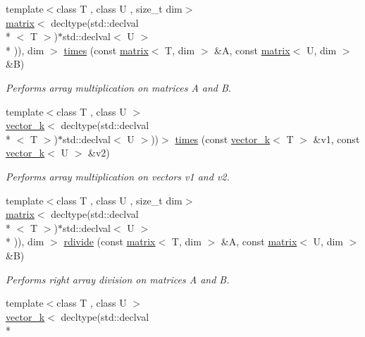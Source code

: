 \begin{DoxyCompactItemize}
\item 
{\footnotesize template$<$class T , class U , size\-\_\-t dim$>$ }\\\hyperlink{classkeycpp_1_1matrix}{matrix}$<$ decltype(std\-::declval\\*
$<$ T $>$)$\ast$std\-::declval$<$ U $>$\\*
)), dim $>$ \hyperlink{namespacekeycpp_a23a0fd48168263aad7f77f1769dc2f2a}{times} (const \hyperlink{classkeycpp_1_1matrix}{matrix}$<$ T, dim $>$ \&A, const \hyperlink{classkeycpp_1_1matrix}{matrix}$<$ U, dim $>$ \&B)
\begin{DoxyCompactList}\small\item\em Performs array multiplication on matrices A and B. \end{DoxyCompactList}\item 
{\footnotesize template$<$class T , class U $>$ }\\\hyperlink{classkeycpp_1_1vector__k}{vector\-\_\-k}$<$ decltype(std\-::declval\\*
$<$ T $>$)$\ast$std\-::declval$<$ U $>$))$>$ \hyperlink{namespacekeycpp_aab613a4c8cc04981045fdea358931780}{times} (const \hyperlink{classkeycpp_1_1vector__k}{vector\-\_\-k}$<$ T $>$ \&v1, const \hyperlink{classkeycpp_1_1vector__k}{vector\-\_\-k}$<$ U $>$ \&v2)
\begin{DoxyCompactList}\small\item\em Performs array multiplication on vectors v1 and v2. \end{DoxyCompactList}\item 
{\footnotesize template$<$class T , class U , size\-\_\-t dim$>$ }\\\hyperlink{classkeycpp_1_1matrix}{matrix}$<$ decltype(std\-::declval\\*
$<$ T $>$)$\ast$std\-::declval$<$ U $>$\\*
)), dim $>$ \hyperlink{namespacekeycpp_a6d379c0b2c9d430f498daae5601f7a79}{rdivide} (const \hyperlink{classkeycpp_1_1matrix}{matrix}$<$ T, dim $>$ \&A, const \hyperlink{classkeycpp_1_1matrix}{matrix}$<$ U, dim $>$ \&B)
\begin{DoxyCompactList}\small\item\em Performs right array division on matrices A and B. \end{DoxyCompactList}\item 
{\footnotesize template$<$class T , class U $>$ }\\\hyperlink{classkeycpp_1_1vector__k}{vector\-\_\-k}$<$ decltype(std\-::declval\\*

\end{DoxyCompactItemize}

